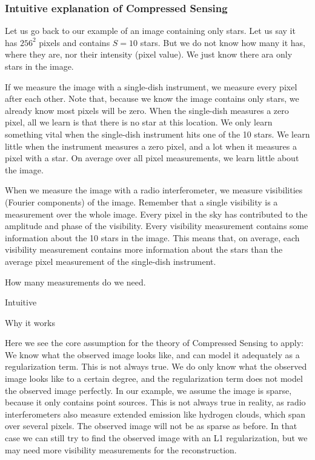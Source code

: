 \subsubsection{Intuitive explanation of Compressed Sensing}\label{radio:cd:intuitive}
Let us go back to our example of an image containing only stars. Let us say it has $256^2$ pixels and contains $S = 10$ stars. But we do not know how many it has, where they are, nor their intensity (pixel value). We just know there ara only stars in the image. 

If we measure the image with a single-dish instrument, we measure every pixel after each other. Note that, because we know the image contains only stars, we already know most pixels will be zero. When the single-dish measures a zero pixel, all we learn is that there is no star at this location. We only learn something vital when the single-dish instrument hits one of the 10 stars. We learn little when the instrument measures a zero pixel, and a lot when it measures a pixel with a star. On average over all pixel measurements, we learn little about the image.


When we measure the image with a radio interferometer, we measure visibilities (Fourier components) of the image. Remember that a single visibility is a measurement over the whole image. Every pixel in the sky has contributed to the amplitude and phase of the visibility. Every visibility measurement contains some information about the 10 stars in the image. This means that, on average, each visibility measurement contains more information about the stars than the average pixel measurement of the single-dish instrument.

How many measurements do we need.


Intuitive

Why it works

Here we see the core assumption for the theory of Compressed Sensing to apply: We know what the observed image looks like, and can model it adequately as a regularization term. This is not always true. We do only know what the observed image looks like to a certain degree, and the regularization term does not model the observed image perfectly. In our example, we assume the image is sparse, because it only contains point sources. This is not always true in reality, as radio interferometers also measure extended emission like hydrogen clouds, which span over several pixels. The observed image will not be as sparse as before. In that case we can still try to find the observed image with an L1 regularization, but we may need more visibility measurements for the reconstruction.


